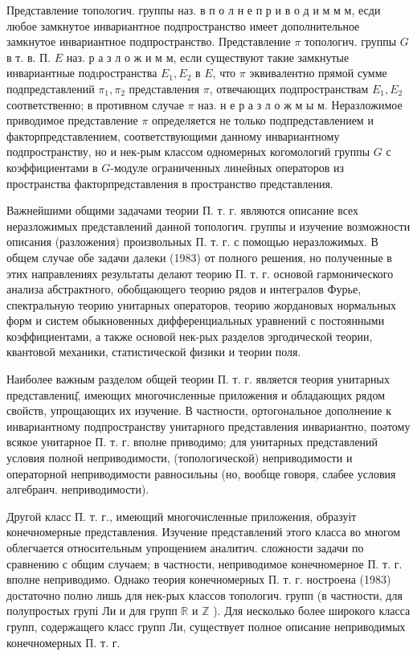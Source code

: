\documentclass[10pt]{article}
\begin{document}
Представление топологич. группы наз. в п о л н е п р и в о д и м м м, есди любое замкнутое инвариантное подпространство имеет дополнительное замкнутое инвариантное подпространство. Представление $\pi$ топологич. группы $G$ в т. в. П. $E$ наз. р а з л о ж и м м, если существуют такие замкнутые инвариантные подıространства $E_{1}, E_{2}$ в $E$, что $\pi$ эквивалентно прямой сумме подпредставлений $\pi_{1}, \pi_{2}$ представления $\pi$, отвечающих подпространствам $E_{1}, E_{2}$ соответственно; в противном случае $\pi$ наз. н е р а з л о ж м ы м. Неразложимое приводимое представление $\pi$ определяется не только подпредставлением и факторпредставлением, соответствующими данному инвариантному подпространству, но и нек-рым классом одномерных когомологий группы $G$ с коэффициентами в $G$-модуле ограниченных линейных операторов из пространства факторпредставления в пространство представления.



Важнейшими общими задачами теории П. т. г. являются описание всех неразложимых представлений данной топологич. группы и изучение возможности описания (разложения) произвольных П. т. г. с помощью неразложимых. В общем случае обе задачи далеки (1983) от полного решения, но полученные в этих направлениях результаты делают теорию П. т. г. основой гармонического анализа абстрактного, обобщающего теорию рядов и интегралов Фурье, спектральную теорию унитарных операторов, теорию жордановых нормальных форм и систем обыкновенных дифференциальных уравнений с постоянными коэффициентами, а также основой нек-рых разделов эргодической теории, квантовой механики, статистической физики и теории поля.



Наиболее важным разделом общей теории П. т. г. является теория унитарных представлениц̆, имеющих многочисленные приложения и обладающих рядом свойств, упрощающих их изучение. В частности, ортогональное дополнение к инвариантному подпространству унитарного представления инвариантно, поәтому всякое унитарное П. т. г. вполне приводимо; для унитарных представлений условия полной неприводимости, (топологической) неприводимости и операторной неприводимости равносильны (но, вообще говоря, слабее условия алгебраич. неприводимости).



Другой класс П. т. г., имеющий многочисленные приложения, образуіт конечномерные представления. Изучение представлений этого класса во многом облегчается относительным упрощением аналитич. сложности задачи по сравнению с общим случаем; в частности, неприводимое конечномерное П. т. г. вполне неприводимо. Однако теория конечномерных П. т. г. ностроена (1983) достаточно полно лишь для нек-рых классов топологич. групп (в частности, для полупростых групі Ли и для групп $\mathbb{R}$ и $\mathbb{Z}$ ). Для несколько более широкого класса групп, содержащего класс групп Ли, существует полное описание неприводимых конечномерных П. т. г.
\end{document}

